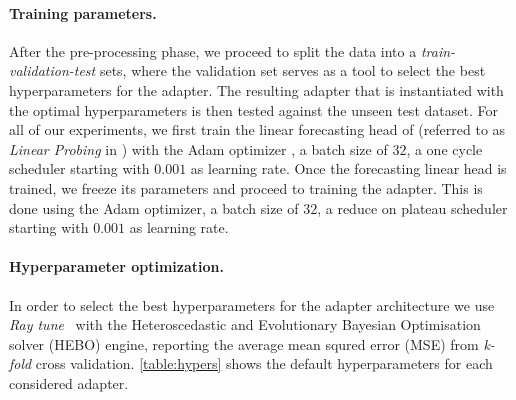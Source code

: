 \paragraph{Training parameters.} After the pre-processing phase, we proceed to split the data into a \emph{train-validation-test} sets, where the validation set serves as a tool to select the best hyperparameters for the adapter. The resulting adapter that is instantiated with the optimal hyperparameters is then tested against the unseen test dataset. For all of our experiments, we first train the linear forecasting head of \moment (referred to as \emph{Linear Probing} in \cite{goswami2024moment}) with the Adam optimizer \citep{kingma2017adammethodstochasticoptimization}, a batch size of $32$, a one cycle scheduler starting with $0.001$ as learning rate. Once the forecasting linear head is trained, we freeze its parameters and proceed to training the adapter. This is done using the Adam optimizer, a batch size of $32$, a reduce on plateau scheduler starting with $0.001$ as learning rate.



\paragraph{Hyperparameter optimization.} In order to select the best hyperparameters for the adapter architecture we use \emph{Ray tune}~\citep{liaw2018tuneresearchplatformdistributed} with the Heteroscedastic and Evolutionary Bayesian Optimisation solver (HEBO) \citep{Cowen-Rivers2022-HEBO} engine, reporting the average mean squred error (MSE) from \emph{k-fold} cross validation. \cref{table:hypers} shows the default hyperparameters for each considered adapter.

